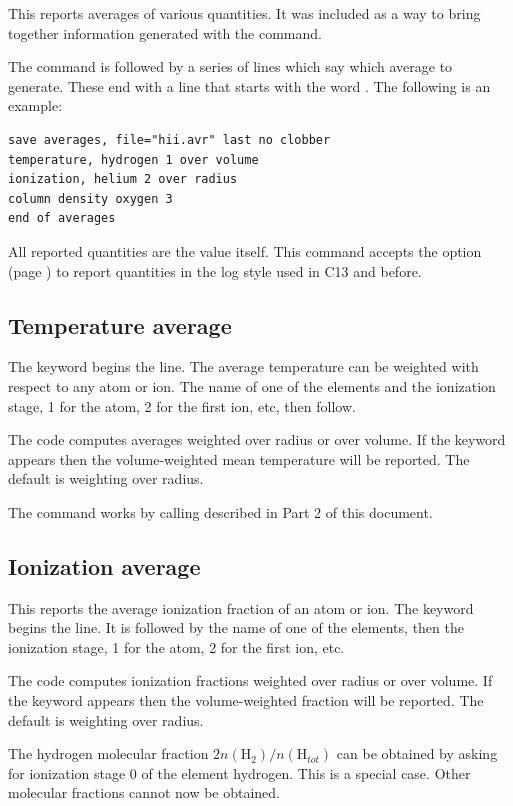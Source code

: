 This reports averages of various quantities.
It was included as a way
to bring together information generated with the  command.

The  command is followed by a series of lines
which say which average to generate.
These end with a line that starts with the word .
The following is an example:
\begin{verbatim}
save averages, file="hii.avr" last no clobber
temperature, hydrogen 1 over volume
ionization, helium 2 over radius
column density oxygen 3
end of averages
\end{verbatim}

All reported quantities are the value itself.
This command accepts the  option 
(page \pageref{sec:SaveLogOption}) to report quantities in the
log style used in C13 and before. 

\subsection{Temperature average}

The keyword  begins the line.
The average temperature can
be weighted with respect to any atom or ion.
The name of one of the elements
and the ionization stage, 1 for the atom, 2 for the first ion, etc,
then follow.

The code computes averages weighted over radius or over volume.
If the
keyword  appears then the volume-weighted mean temperature will be
reported.
The default is weighting over radius.

The command works by calling  described in
Part 2 of this document.

\subsection{Ionization average}

This reports the average ionization fraction of an atom or ion.
The
keyword  begins the line.
It is followed by the name of one of
the elements, then the ionization stage, 1 for the atom, 2 for the first
ion, etc.

The code computes ionization fractions weighted over radius or over
volume.
If the keyword  appears then the volume-weighted fraction
will be reported.
The default is weighting over radius.

The hydrogen molecular fraction $2n\left( {{\mathrm{H}}_2 } \right)/n\left(
{{\mathrm{H}}_{tot} } \right)$
can be obtained by asking for ionization stage 0 of the element hydrogen.
This is a special case.
Other molecular fractions cannot now be obtained.

